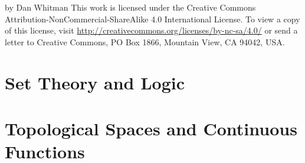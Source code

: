 \textcopyright{} \the\year{} by Dan Whitman
\newline
\newline
\def\liclink{http://creativecommons.org/licenses/by-nc-sa/4.0/}
This work is licensed under the Creative Commons Attribution-NonCommercial-ShareAlike 4.0 International License.
To view a copy of this license, visit \href{\liclink}{\liclink} or send a letter to Creative Commons, PO Box 1866, Mountain View, CA 94042, USA.

\begin{center}
  \ccbyncsa
\end{center}

\newpage
\tableofcontents

\newpage

\setcounter{page}{1} 

\begin{questions}

\newcommand\insec[1]{}

\section{Set Theory and Logic}
\insec{01}
\insec{02}
\insec{03}
\insec{04}
\insec{05}
\insec{06}
\insec{07}
\insec{08}
\insec{09}
\insec{10}
\insec{11}
\insec{11_WO}

\section{Topological Spaces and Continuous Functions}
\insec{13}
\insec{16}
\insec{17}
\insec{18}
\insec{19}
\insec{20}
\insec{21}
\insec{22}

\end{questions}

